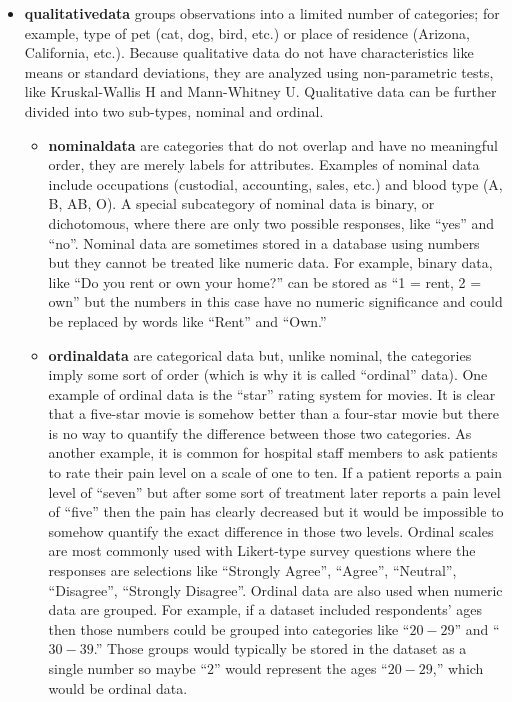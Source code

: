 \begin{itemize}
	
	\item \textbf{\Gls{qualitativedata}} groups observations into a limited number of categories; for example, type of pet (cat, dog, bird, etc.) or place of residence (Arizona, California, etc.). Because qualitative data do not have characteristics like means or standard deviations, they are analyzed using non-parametric tests, like Kruskal-Wallis H and Mann-Whitney U. Qualitative data can be further divided into two sub-types, nominal and ordinal.
	
	\begin{itemize}
		\item \textbf{\Gls{nominaldata}} are categories that do not overlap and have no meaningful order, they are merely labels for attributes. Examples of nominal data include occupations (custodial, accounting, sales, etc.) and blood type (A, B, AB, O). A special subcategory of nominal data is binary, or dichotomous, where there are only two possible responses, like ``yes'' and ``no''. Nominal data are sometimes stored in a database using numbers but they cannot be treated like numeric data. For example, binary data, like ``Do you rent or own your home?'' can be stored as ``1 = rent, 2 = own'' but the numbers in this case have no numeric significance and could be replaced by words like ``Rent'' and ``Own.''
		
		\item \textbf{\Gls{ordinaldata}} are categorical data but, unlike nominal, the categories imply some sort of order (which is why it is called ``ordinal'' data). One example of ordinal data is the ``star'' rating system for movies. It is clear that a five-star movie is somehow better than a four-star movie but there is no way to quantify the difference between those two categories. As another example, it is common for hospital staff members to ask patients to rate their pain level on a scale of one to ten. If a patient reports a pain level of ``seven'' but after some sort of treatment later reports a pain level of ``five'' then the pain has clearly decreased but it would be impossible to somehow quantify the exact difference in those two levels. Ordinal scales are most commonly used with Likert-type survey questions where the responses are selections like ``Strongly Agree'', ``Agree'', ``Neutral'', ``Disagree'', ``Strongly Disagree''. Ordinal data are also used when numeric data are grouped. For example, if a dataset included respondents' ages then those numbers could be grouped into categories like ``$ 20-29 $'' and ``$ 30-39 $.'' Those groups would typically be stored in the dataset as a single number so maybe ``$ 2 $'' would represent the ages ``$ 20-29 $,'' which would be ordinal data.
	\end{itemize}
	

\end{itemize}
